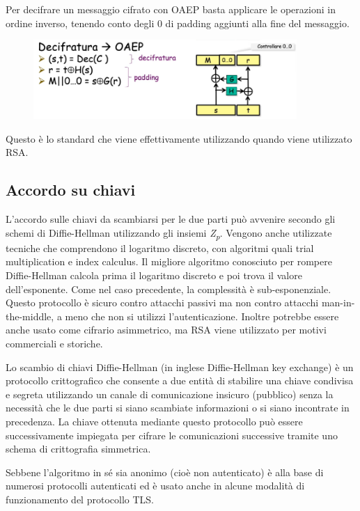 Per decifrare un messaggio cifrato con OAEP basta applicare le operazioni in ordine inverso, tenendo conto degli 0 di padding aggiunti alla fine del messaggio.

\begin{figure}[htb!]
    \centering
    \includegraphics[width=10cm]{./Images/cap1/1.50.png}
\end{figure} 

Questo è lo standard che viene effettivamente utilizzando quando viene utilizzato RSA. 

\subsection{Accordo su chiavi}
L'accordo sulle chiavi da scambiarsi per le due parti può avvenire secondo gli schemi di Diffie-Hellman utilizzando gli insiemi \textit{Z\textsubscript{p}}. Vengono anche utilizzate tecniche che comprendono il logaritmo discreto, con algoritmi quali trial multiplication e index calculus. Il migliore algoritmo conosciuto per rompere Diffie-Hellman  calcola prima il logaritmo discreto e poi trova il valore dell'esponente. Come nel caso precedente, la complessità è sub-esponenziale. Questo protocollo è sicuro contro attacchi passivi ma non contro attacchi man-in-the-middle, a meno che non si utilizzi l'autenticazione. Inoltre potrebbe essere anche usato come cifrario asimmetrico, ma RSA viene utilizzato per motivi commerciali e storiche.

Lo scambio di chiavi Diffie-Hellman (in inglese Diffie-Hellman key exchange) è un protocollo crittografico che consente a due entità di stabilire una chiave condivisa e segreta utilizzando un canale di comunicazione insicuro (pubblico) senza la necessità che le due parti si siano scambiate informazioni o si siano incontrate in precedenza. La chiave ottenuta mediante questo protocollo può essere successivamente impiegata per cifrare le comunicazioni successive tramite uno schema di crittografia simmetrica.

Sebbene l'algoritmo in sé sia anonimo (cioè non autenticato) è alla base di numerosi protocolli autenticati ed è usato anche in alcune modalità di funzionamento del protocollo TLS.

